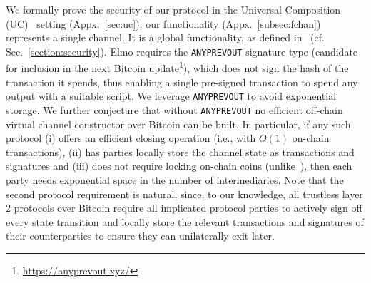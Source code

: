   We formally prove the security of our protocol in the Universal
  Composition (UC)~\cite{uc} setting (Appx.~\ref{sec:uc}); our functionality
  \fchan (Appx.~\ref{subsec:fchan}) represents
  a single channel. It is a global functionality,
  as defined in~\cite{DBLP:conf/tcc/BadertscherCHTZ20} (cf.
  Sec.~\ref{section:security}).
%
  Elmo requires the \texttt{ANYPREVOUT} signature
  type (candidate for
  inclusion in the next Bitcoin update\footnote{\url{https://anyprevout.xyz/}}), which does not sign the hash of the
  transaction it spends, thus enabling a single pre-signed transaction
  to spend any output with a suitable script. We leverage \texttt{ANYPREVOUT} to
  avoid exponential storage.
  We further conjecture that without
  \texttt{ANYPREVOUT} no efficient off-chain virtual channel constructor
  over Bitcoin can be built. In particular, if any such protocol
  (i) offers an efficient closing operation (i.e., with $O(1)$ on-chain
  transactions), (ii) has parties locally store the channel state as transactions and
  signatures and (iii) does not require locking on-chain
  coins (unlike~\cite{donner}), then each party needs exponential
  space in the number of intermediaries. Note that the second protocol
  requirement is natural, since, to our knowledge, all trustless layer $2$
  protocols over Bitcoin require all implicated protocol parties to actively
  sign off every state transition and locally store the relevant transactions
  and signatures of their counterparties to ensure they can
  unilaterally exit later.
